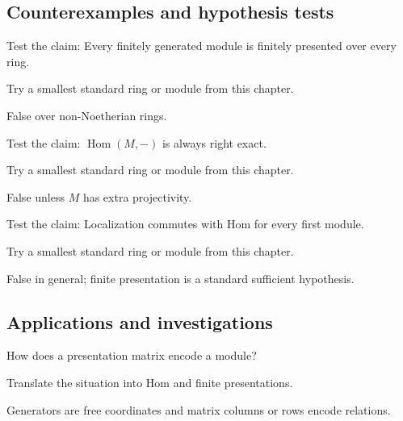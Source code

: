 \subsection*{Counterexamples and hypothesis tests}

\begin{exercise}\label{exr:v12-expand-10}
Test the claim: Every finitely generated module is finitely presented over every ring.
\end{exercise}
\begin{hint}
Try a smallest standard ring or module from this chapter.
\end{hint}
\begin{solution}
False over non-Noetherian rings.
\end{solution}

\begin{exercise}\label{exr:v12-expand-11}
Test the claim: $\operatorname{Hom}(M,-)$ is always right exact.
\end{exercise}
\begin{hint}
Try a smallest standard ring or module from this chapter.
\end{hint}
\begin{solution}
False unless $M$ has extra projectivity.
\end{solution}

\begin{exercise}\label{exr:v12-expand-12}
Test the claim: Localization commutes with Hom for every first module.
\end{exercise}
\begin{hint}
Try a smallest standard ring or module from this chapter.
\end{hint}
\begin{solution}
False in general; finite presentation is a standard sufficient hypothesis.
\end{solution}

\subsection*{Applications and investigations}

\begin{exercise}\label{exr:v12-expand-13}
How does a presentation matrix encode a module?
\end{exercise}
\begin{hint}
Translate the situation into Hom and finite presentations.
\end{hint}
\begin{solution}
Generators are free coordinates and matrix columns or rows encode relations.
\end{solution}

